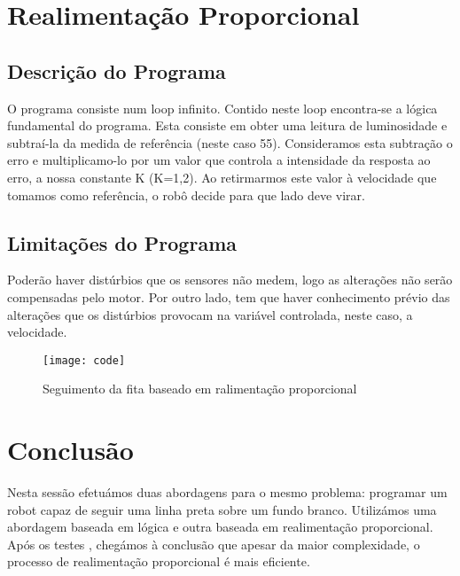 \documentclass{article}
\begin{document}
\section{Realimentação Proporcional}
\subsection{Descrição do Programa}
O programa consiste num loop infinito. Contido neste loop encontra-se a lógica
fundamental do programa. Esta consiste em obter uma leitura de luminosidade e
subtraí-la da medida de referência (neste caso 55). Consideramos esta subtração
o erro e multiplicamo-lo por um valor que controla a intensidade da resposta ao
erro, a nossa constante K (K=1,2). Ao retirmarmos este valor à velocidade que
tomamos como referência, o robô decide para que lado deve virar.
\subsection{Limitações do Programa}
Poderão haver distúrbios que os sensores não medem, logo as alterações não serão
compensadas pelo motor. Por outro lado, tem que haver conhecimento prévio das
alterações que os distúrbios provocam na variável controlada, neste caso,
 a velocidade.

\begin{figure}[H]
    \centering
    \texttt{[image: code]}
    \caption{Seguimento da fita baseado em ralimentação proporcional}
\end{figure}

\section{Conclusão}
Nesta sessão efetuámos duas abordagens para o mesmo problema: programar um robot
capaz de seguir uma linha preta sobre um fundo branco. Utilizámos uma abordagem
baseada em lógica  e outra baseada em realimentação proporcional. Após os testes
, chegámos à conclusão que apesar da maior complexidade, o processo de
realimentação proporcional é mais eficiente.
\end{document}
